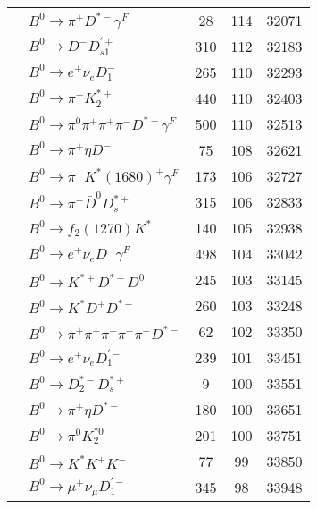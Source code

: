 \documentclass[landscape]{article}
\newcounter{rownumbers}
\newcommand\rn{\stepcounter{rownumbers}\arabic{rownumbers}}
\newcommand{\EOL}{\\} %
\newcommand{\topoTags}[1]{#1} %
\begin{document}
\begin{longtable}{clccc}
\rn & $ B^{0} \rightarrow \pi^{+} D^{*-} \gamma^{F} $ & \topoTags{28 & }114 & 32071 \EOL

\rn & $ B^{0} \rightarrow D^{-} D_{s1}^{\prime+} $ & \topoTags{310 & }112 & 32183 \EOL

\rn & $ B^{0} \rightarrow e^{+} \nu_{e} D_{1}^{-} $ & \topoTags{265 & }110 & 32293 \EOL

\rn & $ B^{0} \rightarrow \pi^{-} K_2^{*+} $ & \topoTags{440 & }110 & 32403 \EOL

\rn & $ B^{0} \rightarrow \pi^{0} \pi^{+} \pi^{+} \pi^{-} D^{*-} \gamma^{F} $ & \topoTags{500 & }110 & 32513 \EOL

\rn & $ B^{0} \rightarrow \pi^{+} \eta D^{-} $ & \topoTags{75 & }108 & 32621 \EOL

\rn & $ B^{0} \rightarrow \pi^{-} K^{*}(1680)^{+} \gamma^{F} $ & \topoTags{173 & }106 & 32727 \EOL

\rn & $ B^{0} \rightarrow \pi^{-} \bar{D}^{0} D_{s}^{*+} $ & \topoTags{315 & }106 & 32833 \EOL

\rn & $ B^{0} \rightarrow f_{2}(1270) K^{*} $ & \topoTags{140 & }105 & 32938 \EOL

\rn & $ B^{0} \rightarrow e^{+} \nu_{e} D^{-} \gamma^{F} $ & \topoTags{498 & }104 & 33042 \EOL

\rn & $ B^{0} \rightarrow K^{*+} D^{*-} D^{0} $ & \topoTags{245 & }103 & 33145 \EOL

\rn & $ B^{0} \rightarrow K^{*} D^{+} D^{*-} $ & \topoTags{260 & }103 & 33248 \EOL

\rn & $ B^{0} \rightarrow \pi^{+} \pi^{+} \pi^{+} \pi^{-} \pi^{-} D^{*-} $ & \topoTags{62 & }102 & 33350 \EOL

\rn & $ B^{0} \rightarrow e^{+} \nu_{e} D_{1}^{\prime-} $ & \topoTags{239 & }101 & 33451 \EOL

\rn & $ B^{0} \rightarrow D_{2}^{*-} D_{s}^{*+} $ & \topoTags{9 & }100 & 33551 \EOL

\rn & $ B^{0} \rightarrow \pi^{+} \eta D^{*-} $ & \topoTags{180 & }100 & 33651 \EOL

\rn & $ B^{0} \rightarrow \pi^{0} K_2^{*0} $ & \topoTags{201 & }100 & 33751 \EOL

\rn & $ B^{0} \rightarrow K^{*} K^{+} K^{-} $ & \topoTags{77 & }99 & 33850 \EOL

\rn & $ B^{0} \rightarrow \mu^{+} \nu_{\mu} D_{1}^{\prime-} $ & \topoTags{345 & }98 & 33948 \EOL


\end{longtable}
\end{document}
